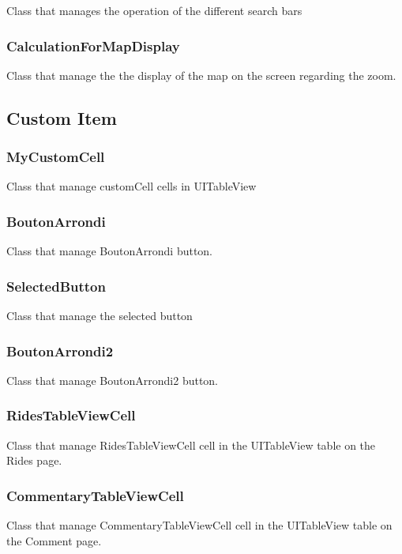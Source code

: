 Class that manages the operation of the different search bars

\subsubsection{CalculationForMapDisplay}

Class that manage the the display of the map on the screen regarding the zoom.

\subsection{Custom Item}

\subsubsection{MyCustomCell}

Class that manage customCell cells in UITableView

\subsubsection{BoutonArrondi}

Class that manage BoutonArrondi button.

\subsubsection{SelectedButton}

Class that manage the selected button

\subsubsection{BoutonArrondi2}

Class that manage BoutonArrondi2 button.

\subsubsection{RidesTableViewCell}

Class that manage RidesTableViewCell cell in the UITableView table on the Rides page.

\subsubsection{CommentaryTableViewCell}

Class that manage CommentaryTableViewCell cell in the UITableView table on the Comment page.














